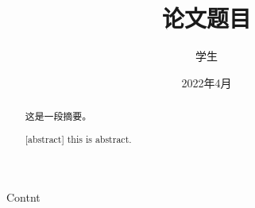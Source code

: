 \documentclass[]{GZUthesis}
\author{学生}
\title{论文题目}
\date{2022年4月}
\begin{document}
\maketitle
\begin{abstract}
    这是一段摘要。
\end{abstract}
\newline
{}
\newpage
\begin{abstract}[abstract]
    this is abstract.
\end{abstract}
\newpage
Contnt
\end{document}
